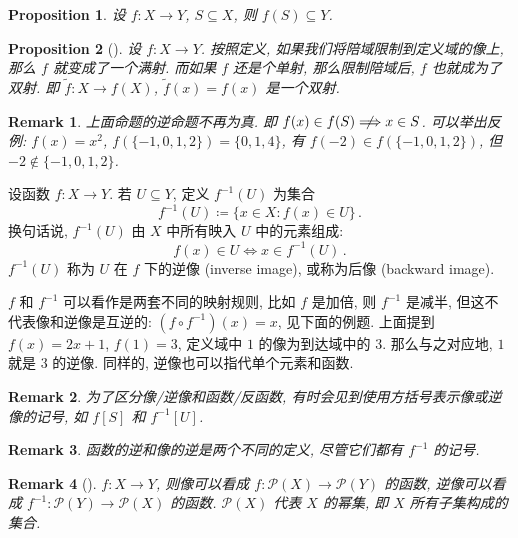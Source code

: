 \documentclass[UTF8]{ctexart}
\theoremstyle{mystyle}
\newtheorem{proposition}{Proposition}[section]
\theoremstyle{myremark}
\newtheorem*{remark}{Remark}
\theoremstyle{plain}
\renewcommand{\cal}{\mathcal}
\newcommand{\set}[1]{\{#1\}}
\begin{document}
\begin{proposition}
    设 $ f \colon X \to Y $, $ S \subseteq X $, 则 $ f(S) \subseteq Y $.
\end{proposition}

\begin{proposition}[]
    设 $ f \colon X \to Y $. 按照定义, 如果我们将陪域限制到定义域的像上, 那么 $ f $ 就变成了一个满射. 而如果 $ f $ 还是个单射, 那么限制陪域后, $ f $ 也就成为了双射. 即 $ \widetilde{f} \colon X \to f(X) $, $ \widetilde{f}(x) = f(x) $ 是一个双射.
\end{proposition}

\begin{remark}
    上面命题的逆命题不再为真. 即 $ f(x) \in f(S) \centernot \Longrightarrow x \in S $. 可以举出反例: $ f(x) = x^2 $, $ f(\set{-1, 0, 1, 2}) = \set{0, 1, 4} $, 有 $ f(-2) \in f(\set{-1, 0, 1, 2}) $, 但 $ -2 \not\in \set{-1, 0, 1, 2} $.
\end{remark}

\begin{definition}[\text{逆像}]
    设函数 $ f \colon X \to Y $. 若 $ U \subseteq Y $, 定义 $ f^{-1} (U) $ 为集合 \[ f ^{-1} (U) \coloneqq \set{x \in X \colon f(x) \in U} \,.\]
    换句话说, $ f^{-1}(U) $ 由 $ X $ 中所有映入 $ U $ 中的元素组成: \[ f(x) \in U \Longleftrightarrow x \in f^{-1}(U) \,.\] $ f^{-1}(U) $ 称为 $ U $ 在 $ f $ 下的逆像 (inverse image), 或称为后像 (backward image).
\end{definition}

$ f $ 和 $ f^{-1} $ 可以看作是两套不同的映射规则, 比如 $ f $ 是加倍, 则 $ f^{-1} $ 是减半, 但这不代表像和逆像是互逆的: $ (f \circ f^{-1})(x) = x $, 见下面的例题. 上面提到 $ f(x) = 2 x + 1 $, $ f(1) = 3 $, 定义域中 $ 1 $ 的像为到达域中的 $ 3 $. 那么与之对应地, $ 1 $ 就是 $ 3 $ 的逆像. 同样的, 逆像也可以指代单个元素和函数.

\begin{remark}
    为了区分像/逆像和函数/反函数, 有时会见到使用方括号表示像或逆像的记号, 如 $ f[S] $ 和 $ f^{-1}[U] $.
\end{remark}

\begin{remark}
    函数的逆和像的逆是两个不同的定义, 尽管它们都有 $ f^{-1} $ 的记号.
\end{remark}

\begin{remark}[]
    $ f \colon X \to Y $, 则像可以看成 $ f \colon \cal P (X) \to \cal P (Y) $ 的函数, 逆像可以看成 $ f^{-1} \colon \cal P(Y) \to \cal P(X) $ 的函数. $ \cal P(X) $ 代表 $ X $ 的幂集, 即 $ X $ 所有子集构成的集合.
\end{remark}
\end{document}
